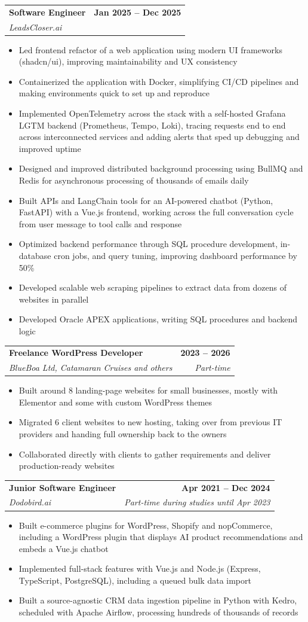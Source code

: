 \documentclass[a4paper,11pt]{article}
\makeatletter
\newcommand{\resumeItem}[1]{
  \item\small{
    {#1 \vspace{-2pt}}
  }
}
\newcommand{\resumeSubheading}[4]{
  \vspace{-2pt}\item
    \begin{tabular*}{1.0\textwidth}[t]{l@{\extracolsep{\fill}}r}
      \textbf{#1} & \textbf{\small #2} \\
      \textit{\small#3} & \textit{\small #4} \\
    \end{tabular*}\vspace{-7pt}
}
\newcommand{\resumeItemListStart}{\begin{itemize}[itemsep=2pt, topsep=3pt, parsep=0pt]}
\newcommand{\resumeItemListEnd}{\end{itemize}\vspace{4pt}}
\makeatother
\begin{document}
    \resumeSubheading
      {Software Engineer}{Jan 2025 -- Dec 2025}
      {LeadsCloser.ai}{}
      \resumeItemListStart
        \resumeItem{Led frontend refactor of a web application using modern UI frameworks (shadcn/ui), improving maintainability and UX consistency}
        \resumeItem{Containerized the application with Docker, simplifying CI/CD pipelines and making environments quick to set up and reproduce}
        \resumeItem{Implemented OpenTelemetry across the stack with a self-hosted Grafana LGTM backend (Prometheus, Tempo, Loki), tracing requests end to end across interconnected services and adding alerts that sped up debugging and improved uptime}
        \resumeItem{Designed and improved distributed background processing using BullMQ and Redis for asynchronous processing of thousands of emails daily}
        \resumeItem{Built APIs and LangChain tools for an AI-powered chatbot (Python, FastAPI) with a Vue.js frontend, working across the full conversation cycle from user message to tool calls and response}
        \resumeItem{Optimized backend performance through SQL procedure development, in-database cron jobs, and query tuning, improving dashboard performance by 50\%}
        \resumeItem{Developed scalable web scraping pipelines to extract data from dozens of websites in parallel}
        \resumeItem{Developed Oracle APEX applications, writing SQL procedures and backend logic}
      \resumeItemListEnd

    \resumeSubheading
      {Freelance WordPress Developer}{2023 -- 2026}
      {BlueBoa Ltd, Catamaran Cruises and others}{Part-time}
      \resumeItemListStart
        \resumeItem{Built around 8 landing-page websites for small businesses, mostly with Elementor and some with custom WordPress themes}
        \resumeItem{Migrated 6 client websites to new hosting, taking over from previous IT providers and handing full ownership back to the owners}
        \resumeItem{Collaborated directly with clients to gather requirements and deliver production-ready websites}
      \resumeItemListEnd

    \resumeSubheading
      {Junior Software Engineer}{Apr 2021 -- Dec 2024}
      {Dodobird.ai}{Part-time during studies until Apr 2023}
      \resumeItemListStart
        \resumeItem{Built e-commerce plugins for WordPress, Shopify and nopCommerce, including a WordPress plugin that displays AI product recommendations and embeds a Vue.js chatbot}
        \resumeItem{Implemented full-stack features with Vue.js and Node.js (Express, TypeScript, PostgreSQL), including a queued bulk data import}
        \resumeItem{Built a source-agnostic CRM data ingestion pipeline in Python with Kedro, scheduled with Apache Airflow, processing hundreds of thousands of records}
      \resumeItemListEnd
\end{document}
